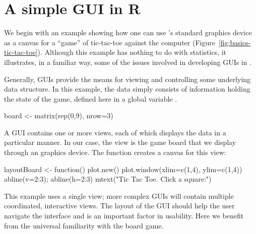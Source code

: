 





\section{A simple GUI in R}
\label{sec:GUI:tic-tac-toe}

We begin with an example showing how one can use \R's standard
graphics device as a canvas for a ``game'' of
tic-tac-toe against the computer (Figure~\ref{fig:basics-tic-tac-toe}). Although this example
has nothing to do with statistics, it illustrates, in a familiar way,
some of the issues involved in developing GUIs in \R. 



Generally, GUIs provide the means for viewing and controlling some
underlying data structure.  In this example, the data simply consists
of information holding the state of the game, defined here in a global
variable .

\begin{Schunk}
\begin{Sinput}
 board <- matrix(rep(0,9), nrow=3)      
\end{Sinput}
\end{Schunk}

A GUI contains one or more views, each of which displays the data in a
particular manner.  In our case, the view is the game board that we
display through an \R\/ graphics device. The 
function creates a canvas for this view:
\begin{Schunk}
\begin{Sinput}
 layoutBoard <- function() {
   plot.new()
   plot.window(xlim=c(1,4), ylim=c(1,4))
   abline(v=2:3);  abline(h=2:3)
   mtext("Tic Tac Toe. Click a square:")
 }
\end{Sinput}
\end{Schunk}
%
This example uses a single view; more complex GUIs
will contain multiple coordinated, interactive views. The layout of
the GUI should help the user navigate the interface and is an
important factor in usability. Here we benefit from the universal
familiarity with the board game.


